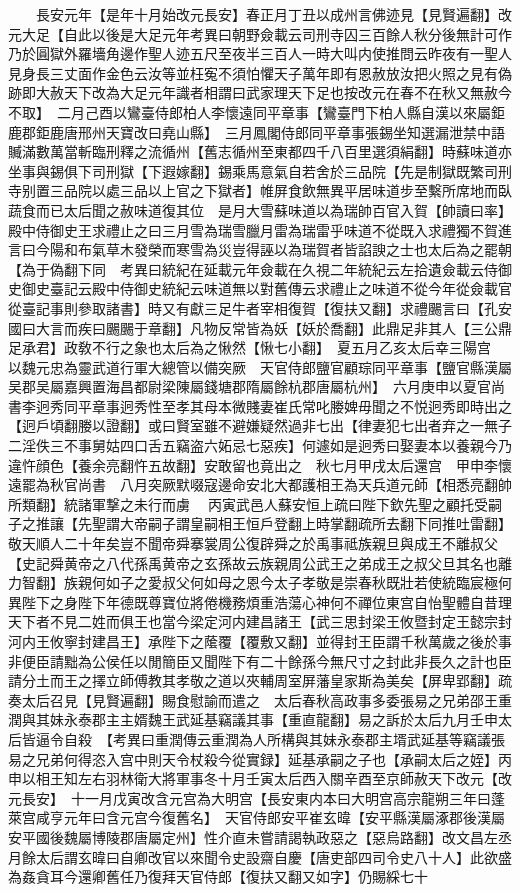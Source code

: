 　　長安元年【是年十月始改元長安】春正月丁丑以成州言佛迹見【見賢遍翻】改元大足【自此以後是大足元年考異曰朝野僉載云司刑寺囚三百餘人秋分後無計可作乃於圓獄外羅墻角邊作聖人迹五尺至夜半三百人一時大叫内使推問云昨夜有一聖人見身長三丈面作金色云汝等並枉寃不須怕懼天子萬年即有恩赦放汝把火照之見有偽跡即大赦天下改為大足元年識者相謂曰武家理天下足也按改元在春不在秋又無赦今不取】　二月己酉以鸞臺侍郎柏人李懷遠同平章事【鸞臺門下柏人縣自漢以來屬鉅鹿郡鉅鹿唐邢州天寶改曰堯山縣】　三月鳳閣侍郎同平章事張錫坐知選漏泄禁中語贓滿數萬當斬臨刑釋之流循州【舊志循州至東都四千八百里選須絹翻】時蘇味道亦坐事與錫俱下司刑獄【下遐嫁翻】錫乘馬意氣自若舍於三品院【先是制獄既繁司刑寺别置三品院以處三品以上官之下獄者】帷屏食飲無異平居味道步至繫所席地而臥蔬食而已太后聞之赦味道復其位　是月大雪蘇味道以為瑞帥百官入賀【帥讀曰率】殿中侍御史王求禮止之曰三月雪為瑞雪臘月雷為瑞雷乎味道不從既入求禮獨不賀進言曰今陽和布氣草木發榮而寒雪為災豈得誣以為瑞賀者皆諂諛之士也太后為之罷朝【為于偽翻下同　考異曰統紀在延載元年僉載在久視二年統紀云左拾遺僉載云侍御史御史臺記云殿中侍御史統紀云味道無以對舊傳云求禮止之味道不從今年從僉載官從臺記事則參取諸書】時又有獻三足牛者宰相復賀【復扶又翻】求禮颺言曰【孔安國曰大言而疾曰颺颺于章翻】凡物反常皆為妖【妖於喬翻】此鼎足非其人【三公鼎足承君】政敎不行之象也太后為之愀然【愀七小翻】　夏五月乙亥太后幸三陽宫　以魏元忠為靈武道行軍大總管以備突厥　天官侍郎鹽官顧琮同平章事【鹽官縣漢屬吴郡吴屬嘉興置海昌都尉梁陳屬錢塘郡隋屬餘杭郡唐屬杭州】　六月庚申以夏官尚書李迥秀同平章事迥秀性至孝其母本微賤妻崔氏常叱媵婢毋聞之不悦迥秀即時出之【迥戶頃翻媵以證翻】或曰賢室雖不避嫌疑然過非七出【律妻犯七出者弃之一無子二淫佚三不事舅姑四口舌五竊盗六妬忌七惡疾】何遽如是迥秀曰娶妻本以養親今乃違忤顔色【養余亮翻忤五故翻】安敢留也竟出之　秋七月甲戌太后還宫　甲申李懷遠罷為秋官尚書　八月突厥默啜寇邊命安北大都護相王為天兵道元師【相悉亮翻帥所類翻】統諸軍撃之未行而虜　丙寅武邑人蘇安恒上疏曰陛下欽先聖之顧托受嗣子之推讓【先聖謂大帝嗣子謂皇嗣相王恒戶登翻上時掌翻疏所去翻下同推吐雷翻】敬天順人二十年矣豈不聞帝舜搴裳周公復辟舜之於禹事祗族親旦與成王不離叔父【史記舜黄帝之八代孫禹黄帝之玄孫故云族親周公武王之弟成王之叔父旦其名也離力智翻】族親何如子之愛叔父何如母之恩今太子孝敬是崇春秋既壯若使統臨宸極何異陛下之身陛下年德既尊寶位將倦機務煩重浩蕩心神何不禪位東宫自怡聖體自昔理天下者不見二姓而俱王也當今梁定河内建昌諸王【武三思封梁王攸暨封定王懿宗封河内王攸寧封建昌王】承陛下之䕃覆【覆敷又翻】並得封王臣謂千秋萬歲之後於事非便臣請黜為公侯任以閒簡臣又聞陛下有二十餘孫今無尺寸之封此非長久之計也臣請分土而王之擇立師傅教其孝敬之道以夾輔周室屏藩皇家斯為美矣【屏卑郢翻】疏奏太后召見【見賢遍翻】賜食慰諭而遣之　太后春秋高政事多委張易之兄弟邵王重潤與其妹永泰郡主主婿魏王武延基竊議其事【重直龍翻】易之訴於太后九月壬申太后皆逼令自殺　【考異曰重潤傳云重潤為人所構與其妹永泰郡主壻武延基等竊議張易之兄弟何得恣入宫中則天令杖殺今從實録】延基承嗣之子也【承嗣太后之姪】丙申以相王知左右羽林衛大將軍事冬十月壬寅太后西入關辛酉至京師赦天下改元【改元長安】　十一月戊寅改含元宫為大明宫【長安東内本曰大明宫高宗龍朔三年曰蓬萊宫咸亨元年曰含元宫今復舊名】　天官侍郎安平崔玄暐【安平縣漢屬涿郡後漢屬安平國後魏屬博陵郡唐屬定州】性介直未嘗請謁執政惡之【惡烏路翻】改文昌左丞月餘太后謂玄暐曰自卿改官以來聞令史設齋自慶【唐吏部四司令史八十人】此欲盛為姦貪耳今還卿舊任乃復拜天官侍郎【復扶又翻又如字】仍賜綵七十